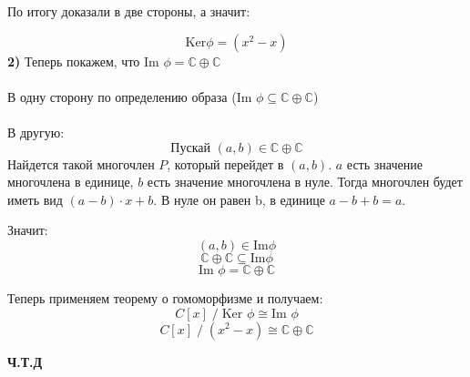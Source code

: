 \documentclass[a4paper,12pt]{article}
\begin{document}
По итогу доказали в две стороны, а значит:

$$\text{Ker} \phi = (x^2 - x)$$
\clearpage
\textbf{2)} 
Теперь покажем, что Im $\phi = \mathbb{C} \oplus \mathbb{C}$
\\\\
В одну сторону по определению образа (Im $\phi \subseteq \mathbb{C} \oplus \mathbb{C}$)
\\\\
В другую:
$$ \text{Пускай } (a, b) \in \mathbb{C} \oplus \mathbb{C}$$
Найдется такой многочлен $P$, который перейдет в $(a, b)$. $a$ есть значение многочлена в единице, $b$ есть значение многочлена в нуле. Тогда многочлен будет иметь вид $(a - b) \cdot x + b$. В нуле он равен b, в единице $a - b + b = a$. 

Значит:
\[
(a, b) \in \text{Im} \phi
\]
\[
\mathbb{C} \oplus \mathbb{C} \subseteq \text{Im} \phi
\]
\[
\text{Im } \phi = \mathbb{C} \oplus \mathbb{C}
\]

Теперь применяем теорему о гомоморфизме и получаем:
\[
C[x]\; / \;\text{Ker } \phi \cong \text{Im } \phi
\]
\[
C[x] \;/ \;(x^2 - x) \cong \mathbb{C} \oplus \mathbb{C}
\]
\begin{center}
\textbf{Ч.Т.Д} 
\end{center}
\end{document}
